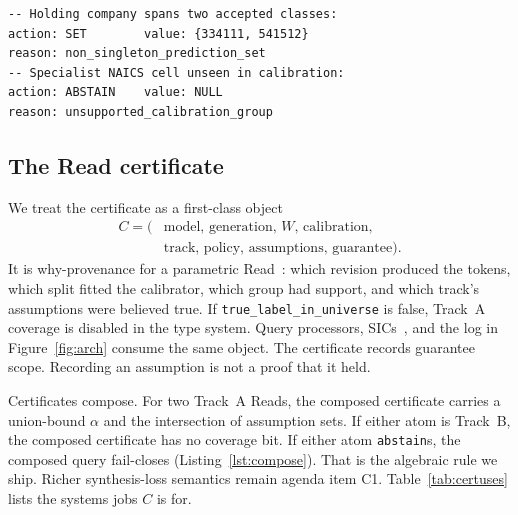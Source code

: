 \documentclass[sigconf, nonacm]{acmart}
\begin{document}
\begin{lstlisting}[caption={The other two legal results of Listing~\ref{lst:sql}. \texttt{SET} is a possible-worlds relation; \texttt{ABSTAIN} is missingness the planner must rewrite.},label={lst:alt}]
-- Holding company spans two accepted classes:
action: SET        value: {334111, 541512}
reason: non_singleton_prediction_set
-- Specialist NAICS cell unseen in calibration:
action: ABSTAIN    value: NULL
reason: unsupported_calibration_group
\end{lstlisting}

\subsection{The Read certificate}
\label{sec:cert}

We treat the certificate as a first-class object
\begin{equation}
\begin{aligned}
C = ( &\mathrm{model},\,\mathrm{generation},\,W,\,\mathrm{calibration},\\
      &\mathrm{track},\,\mathrm{policy},\,\mathrm{assumptions},\,\mathrm{guarantee}).
\end{aligned}
\end{equation}
It is why-provenance for a parametric Read~\cite{buneman2001why}: which revision produced the tokens, which split fitted the calibrator, which group had support, and which track's assumptions were believed true. If \texttt{true\_label\allowbreak\_in\allowbreak\_universe} is false, Track~A coverage is disabled in the type system. Query processors, SICs~\cite{lee2025sic}, and the log in Figure~\ref{fig:arch} consume the same object. The certificate records guarantee scope. Recording an assumption is not a proof that it held.

Certificates compose. For two Track~A Reads, the composed certificate carries a union-bound $\alpha$ and the intersection of assumption sets. If either atom is Track~B, the composed certificate has no coverage bit. If either atom \texttt{abstain}s, the composed query fail-closes (Listing~\ref{lst:compose}). That is the algebraic rule we ship. Richer synthesis-loss semantics remain agenda item C1. Table~\ref{tab:certuses} lists the systems jobs $C$ is for.
\end{document}
